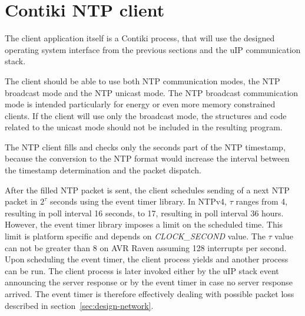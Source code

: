 
\section{Contiki NTP client}
The client application itself is a Contiki process,
that will use the designed operating system interface from the previous sections
and the uIP communication stack.

The client should be able to use both NTP communication modes,
the NTP broadcast mode and the NTP unicast mode.
The NTP broadcast communication mode is intended particularly for energy or
even more memory constrained clients.
If the client will use only the broadcast mode, the structures and code
related to the unicast mode should not be included in the resulting program.



The NTP client fills and checks only the seconds part of the NTP timestamp,
because the conversion to the NTP format would increase the interval
between the timestamp determination and the packet dispatch.

After the filled NTP packet is sent, the client schedules
sending of a next NTP packet in $2^{\tau}$ seconds
using the event timer library.
In NTPv4, $\tau$ ranges from 4, resulting in poll interval 16 seconds,
to 17, resulting in poll interval 36 hours.
However, the event timer library imposes a limit on the scheduled time.
This limit is platform specific and depends on {\it{CLOCK\_SECOND}} value.
The $\tau$ value can not be greater than 8 on AVR Raven assuming 128 interrupts per second.
Upon scheduling the event timer, the client process yields
and another process can be run.
The client process is later invoked either by the uIP stack event
announcing the server response
or by the event timer in case no server response arrived.
The event timer is therefore effectively
dealing with possible packet loss described in section~\ref{sec:design-network}.




